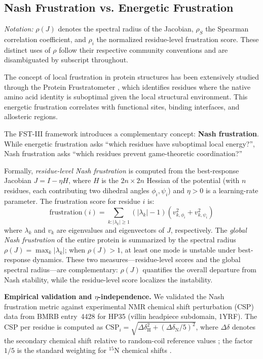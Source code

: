 \documentclass[12pt,a4paper]{article}
\theoremstyle{remark}
\begin{document}
\subsection{Nash Frustration vs. Energetic Frustration}

\noindent\textit{Notation:} $\rho(J)$ denotes the spectral radius of the Jacobian, $\rho_S$ the Spearman correlation coefficient, and $\rho_i$ the normalized residue-level frustration score. These distinct uses of $\rho$ follow their respective community conventions and are disambiguated by subscript throughout.

The concept of local frustration in protein structures has been extensively studied through the Protein Frustratometer \citep{Ferreiro2007,Ferreiro2014}, which identifies residues where the native amino acid identity is suboptimal given the local structural environment. This energetic frustration correlates with functional sites, binding interfaces, and allosteric regions.

The FST-III framework introduces a complementary concept: \textbf{Nash frustration}. While energetic frustration asks ``which residues have suboptimal local energy?'', Nash frustration asks ``which residues prevent game-theoretic coordination?''

Formally, \emph{residue-level Nash frustration} is computed from the best-response Jacobian $J = I - \eta H$, where $H$ is the $2n \times 2n$ Hessian of the potential (with $n$ residues, each contributing two dihedral angles $\phi_i, \psi_i$) and $\eta > 0$ is a learning-rate parameter. The frustration score for residue $i$ is:
\begin{equation}
\text{frustration}(i) = \sum_{k: |\lambda_k| \geq 1} (|\lambda_k| - 1) \left( v_{k,\phi_i}^2 + v_{k,\psi_i}^2 \right)
\end{equation}
where $\lambda_k$ and $v_k$ are eigenvalues and eigenvectors of $J$, respectively. The \emph{global Nash frustration} of the entire protein is summarized by the spectral radius $\rho(J) = \max_k |\lambda_k|$; when $\rho(J) > 1$, at least one mode is unstable under best-response dynamics. These two measures---residue-level scores and the global spectral radius---are complementary: $\rho(J)$ quantifies the overall departure from Nash stability, while the residue-level score localizes the instability.

\textbf{Empirical validation and $\eta$-independence.}
We validated the Nash frustration metric against experimental NMR chemical shift perturbation (CSP) data from BMRB entry~4428 \cite{BMRB4428} for HP35 (villin headpiece subdomain, 1YRF). The CSP per residue is computed as $\text{CSP}_i = \sqrt{\Delta\delta_{\text{H}}^2 + (\Delta\delta_{\text{N}}/5)^2}$, where $\Delta\delta$ denotes the secondary chemical shift relative to random-coil reference values \cite{Wishart1995}; the factor $1/5$ is the standard weighting for ${}^{15}$N chemical shifts \cite{Williamson2013}.
\end{document}

